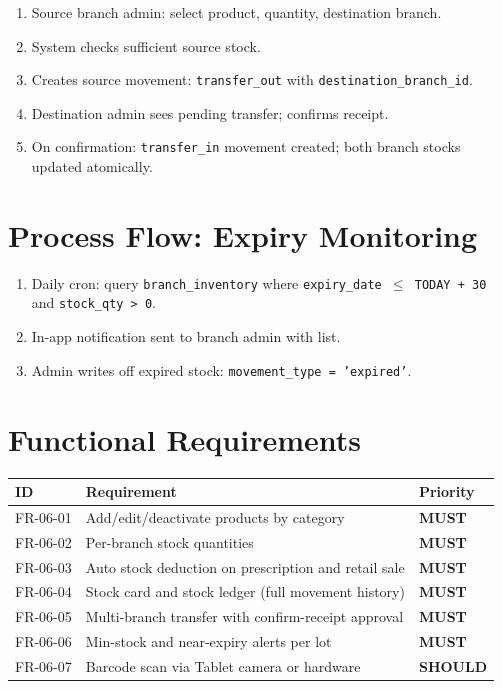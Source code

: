\documentclass[12pt,a4paper]{report}
\newcommand{\must}{\colorbox{red!15}{\color{errorred}\textbf{\small MUST}}}
\newcommand{\should}{\colorbox{orange!15}{\color{warnorange}\textbf{\small SHOULD}}}
\begin{document}
\begin{enumerate}
  \item Source branch admin: select product, quantity, destination branch.
  \item System checks sufficient source stock.
  \item Creates source movement: \texttt{transfer\_out} with \texttt{destination\_branch\_id}.
  \item Destination admin sees pending transfer; confirms receipt.
  \item On confirmation: \texttt{transfer\_in} movement created; both branch stocks updated atomically.
\end{enumerate}

\section{Process Flow: Expiry Monitoring}

\begin{enumerate}
  \item Daily cron: query \texttt{branch\_inventory} where \texttt{expiry\_date $\leq$ TODAY + 30} and \texttt{stock\_qty > 0}.
  \item In-app notification sent to branch admin with list.
  \item Admin writes off expired stock: \texttt{movement\_type = 'expired'}.
\end{enumerate}

\section{Functional Requirements}

\begin{longtable}{L{2.5cm} L{9cm} C{2cm}}
\toprule
\textbf{ID} & \textbf{Requirement} & \textbf{Priority} \\\midrule\endhead\bottomrule\endfoot
FR-06-01 & Add/edit/deactivate products by category & \must \\
FR-06-02 & Per-branch stock quantities & \must \\
FR-06-03 & Auto stock deduction on prescription and retail sale & \must \\
FR-06-04 & Stock card and stock ledger (full movement history) & \must \\
FR-06-05 & Multi-branch transfer with confirm-receipt approval & \must \\
FR-06-06 & Min-stock and near-expiry alerts per lot & \must \\
FR-06-07 & Barcode scan via Tablet camera or hardware & \should \\
\end{longtable}
\end{document}
